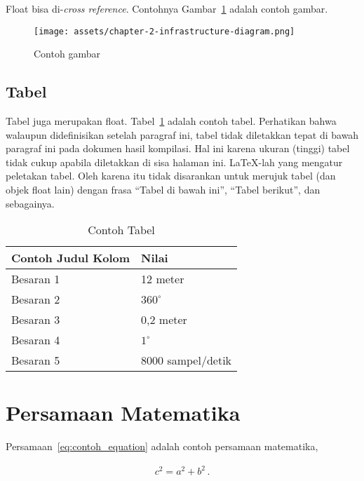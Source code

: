Float bisa di-\textit{cross reference}. Contohnya Gambar~\ref{fig:contoh_gambar} adalah contoh gambar.

\begin{figure}[h]
    \centering
    \texttt{[image: assets/chapter-2-infrastructure-diagram.png]}
    \caption{Contoh gambar}
    \label{fig:contoh_gambar}
\end{figure}

\subsection{Tabel}

Tabel juga merupakan float. Tabel~\ref{table:contoh_tabel} adalah contoh tabel. Perhatikan bahwa walaupun didefinisikan setelah paragraf ini, tabel tidak diletakkan tepat di bawah paragraf ini pada dokumen hasil kompilasi. Hal ini karena ukuran (tinggi) tabel tidak cukup apabila diletakkan di sisa halaman ini. \LaTeX-lah yang mengatur peletakan tabel. Oleh karena itu tidak disarankan untuk merujuk tabel (dan objek float lain) dengan frasa ``Tabel di bawah ini'', ``Tabel berikut'', dan sebagainya.

\begin{table}[htbp]
    \centering
    \caption{Contoh Tabel}
    \label{table:contoh_tabel}
    \begin{tabular}{ll}
        \toprule
        \multicolumn{1}{l}{\textbf{Contoh Judul Kolom}} & \multicolumn{1}{l}{\textbf{Nilai}}\\
        \midrule
        Besaran 1 & 12 meter          \\
        Besaran 2 & $360^\circ$       \\
        Besaran 3 & 0,2 meter         \\
        Besaran 4 & $1^\circ$         \\
        Besaran 5 & 8000 sampel/detik \\
        \bottomrule
    \end{tabular}
\end{table}

\section{Persamaan Matematika}

Persamaan~\eqref{eq:contoh_equation} adalah contoh persamaan matematika,

\begin{align}
    c^2 = a^2 + b^2\,.
\label{eq:contoh_equation}
\end{align}

